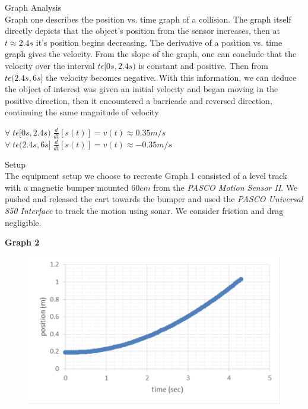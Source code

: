 \documentclass[12pt, letterpaper]{article}
\begin{document}
  \large{Graph Analysis}\\
  Graph one describes the position vs. time graph of a collision.
  The graph itself directly depicts that the object's position from the sensor increases, then at
  $t\approx2.4s$ it's position begins decreasing. The derivative of a position vs. time graph gives the velocity. 
  From the slope of the graph, one can conclude that the velocity over the interval $t\epsilon[0s, 2.4s)$
  is constant and positive. Then from $t \epsilon (2.4s, 6s]$ the velocity becomes negative. With this 
  information, we can deduce the object of interest was given an initial velocity and began moving
  in the positive direction, then it encountered a barricade and reversed direction, continuing the same
  magnitude of velocity\\
  \begin{center}
    $\forall \; t \epsilon [0s, 2.4s) \; \frac{d}{dt}[s(t)]=v(t) \approx 0.35m/s$ \\
    \vspace*{0.2cm} 
    $\forall \; t \epsilon (2.4s, 6s] \; \frac{d}{dt}[s(t)]=v(t) \approx -0.35m/s$ \\ 
  \end{center}

  \large{Setup}\\
  The equipment setup we choose to recreate Graph 1 consisted of a level track with a magnetic 
  bumper mounted $60cm$ from the \emph{PASCO Motion Sensor II}. We pushed and released the cart towards the bumper 
  and used the \emph{PASCO Universal 850 Interface} to track the motion using sonar. We consider 
  friction and drag negligible.\\


  
  \begin{center}
    \Large\textbf{{Graph 2}}\\
  \end{center}

  \begin{figure}[H]
    \centering 
    \includegraphics[width=\linewidth]{graph_2.png}
    \label{fig:graph2}
  \end{figure}
\end{document}
